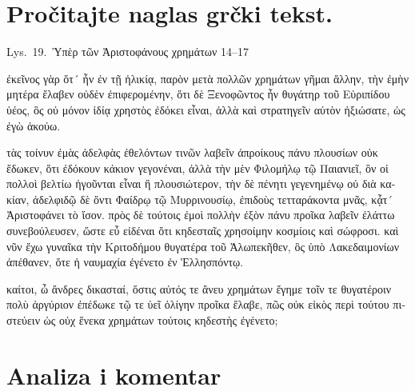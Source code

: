 
\section*{Pročitajte naglas grčki tekst.}

Lys.\ 19.\ Ὑπὲρ τῶν Ἀριστοφάνους χρημάτων 14–17


\medskip


{\large

\begin{greek}

\noindent  ἐκεῖνος γὰρ ὅτ´ ἦν ἐν τῇ ἡλικίᾳ, παρὸν μετὰ πολλῶν χρημάτων γῆμαι ἄλλην, τὴν ἐμὴν μητέρα ἔλαβεν οὐδὲν ἐπιφερομένην, ὅτι δὲ Ξενοφῶντος ἦν θυγάτηρ τοῦ Εὐριπίδου ὑέος, ὃς οὐ μόνον ἰδίᾳ χρηστὸς ἐδόκει εἶναι, ἀλλὰ καὶ στρατηγεῖν αὐτὸν ἠξιώσατε, ὡς ἐγὼ ἀκούω.

τὰς τοίνυν ἐμὰς ἀδελφὰς ἐθελόντων τινῶν λαβεῖν ἀπροίκους πάνυ πλουσίων οὐκ ἔδωκεν, ὅτι ἐδόκουν κάκιον γεγονέναι, ἀλλὰ τὴν μὲν Φιλομήλῳ τῷ Παιανιεῖ, ὃν οἱ πολλοὶ βελτίω ἡγοῦνται εἶναι ἢ πλουσιώτερον, τὴν δὲ πένητι γεγενημένῳ οὐ διὰ κακίαν, ἀδελφιδῷ δὲ ὄντι Φαίδρῳ τῷ Μυρρινουσίῳ, ἐπιδοὺς τετταράκοντα μνᾶς, κᾆτ´ Ἀριστοφάνει τὸ ἴσον. πρὸς δὲ τούτοις ἐμοὶ πολλὴν ἐξὸν πάνυ προῖκα λαβεῖν ἐλάττω συνεβούλευσεν, ὥστε εὖ εἰδέναι ὅτι κηδεσταῖς χρησοίμην κοσμίοις καὶ σώφροσι. καὶ νῦν ἔχω γυναῖκα τὴν Κριτοδήμου θυγατέρα τοῦ Ἀλωπεκῆθεν, ὃς ὑπὸ Λακεδαιμονίων ἀπέθανεν, ὅτε ἡ ναυμαχία ἐγένετο ἐν Ἑλλησπόντῳ.

καίτοι, ὦ ἄνδρες δικασταί, ὅστις αὐτός τε ἄνευ χρημάτων ἔγημε τοῖν τε θυγατέροιν πολὺ ἀργύριον ἐπέδωκε τῷ τε ὑεῖ ὀλίγην προῖκα ἔλαβε, πῶς οὐκ εἰκὸς περὶ τούτου πιστεύειν ὡς οὐχ ἕνεκα χρημάτων τούτοις κηδεστὴς ἐγένετο;


\end{greek}

}


\section*{Analiza i komentar}


